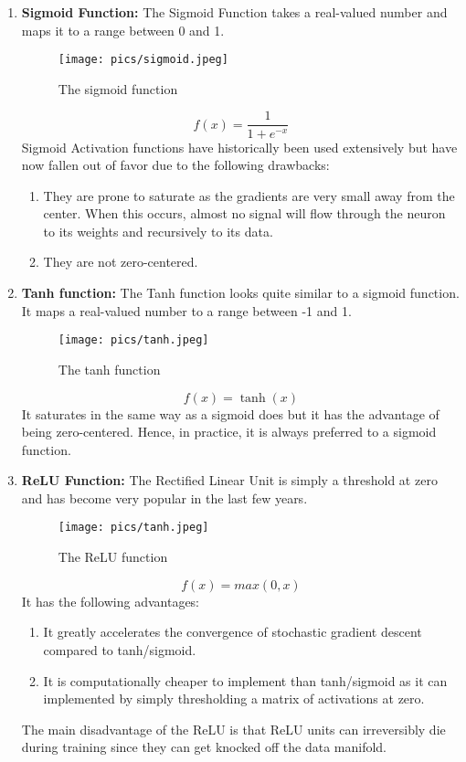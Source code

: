 \documentclass[twoside]{article}
\begin{document}
\begin{enumerate}

\item \textbf{Sigmoid Function:}
The Sigmoid Function takes a real-valued number and maps it to a range between 0 and 1.
\begin{figure}[!htb]
\centering
\texttt{[image: pics/sigmoid.jpeg]}
\caption{The sigmoid function\cite{cs231n-website}}
\label{fig:sigmoid}
\end{figure}
\begin{equation*}
f(x) = \frac{1}{1+e^{-x}}
\end{equation*}
Sigmoid Activation functions have historically been used extensively but have now fallen out of favor due to the following drawbacks:
\begin{enumerate}
\item They are prone to saturate as the gradients are very small away from the center. When this occurs, almost no signal will flow through the neuron to its weights and recursively to its data.
\item They are not zero-centered.
\end{enumerate}

\item \textbf{Tanh function:}
The Tanh function looks quite similar to a sigmoid function. It maps a real-valued number to a range between -1 and 1.
\begin{figure}[!htb]
\centering
\texttt{[image: pics/tanh.jpeg]}
\caption{The tanh function\cite{cs231n-website}}
\label{fig:tanh}
\end{figure}
\begin{equation*}
f(x) = \tanh(x)
\end{equation*}
It saturates in the same way as a sigmoid does but it has the advantage of being zero-centered. Hence, in practice, it is always preferred to a sigmoid function.

\item \textbf{ReLU Function:}
The Rectified Linear Unit is simply a threshold at zero and has become very popular in the last few years.
\begin{figure}[!htb]
\centering
\texttt{[image: pics/tanh.jpeg]}
\caption{The ReLU function\cite{cs231n-website}}
\label{fig:ReLU}
\end{figure}
\begin{equation*}
f(x) = max( 0, x )
\end{equation*}
It has the following advantages:
\begin{enumerate}
\item It greatly accelerates the convergence of stochastic gradient descent compared to tanh/sigmoid.
\item It is computationally cheaper to implement than tanh/sigmoid as it can implemented by simply thresholding a matrix of activations at zero.
\end{enumerate}
The main disadvantage of the ReLU is that ReLU units can irreversibly die during training since they can get knocked off the data manifold.


\end{enumerate}
\end{document}
